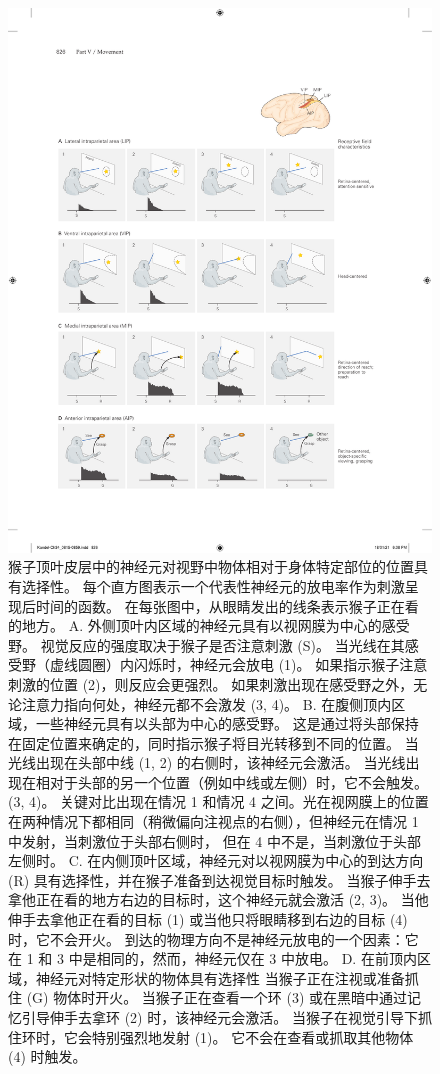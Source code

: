 \begin{figure}[htbp]
	\centering
	\includegraphics[width=0.9\linewidth]{chap34/fig_34_5}
	\caption{猴子顶叶皮层中的神经元对视野中物体相对于身体特定部位的位置具有选择性。 每个直方图表示一个代表性神经元的放电率作为刺激呈现后时间的函数。 在每张图中，从眼睛发出的线条表示猴子正在看的地方。 A. 外侧顶叶内区域的神经元具有以视网膜为中心的感受野。 视觉反应的强度取决于猴子是否注意刺激 (S)。 当光线在其感受野（虚线圆圈）内闪烁时，神经元会放电 (1)。 如果指示猴子注意刺激的位置 (2)，则反应会更强烈。 如果刺激出现在感受野之外，无论注意力指向何处，神经元都不会激发 (3, 4)。 B. 在腹侧顶内区域，一些神经元具有以头部为中心的感受野。 这是通过将头部保持在固定位置来确定的，同时指示猴子将目光转移到不同的位置。 当光线出现在头部中线 (1, 2) 的右侧时，该神经元会激活。 当光线出现在相对于头部的另一个位置（例如中线或左侧）时，它不会触发。 (3, 4)。 关键对比出现在情况 1 和情况 4 之间。光在视网膜上的位置在两种情况下都相同（稍微偏向注视点的右侧），但神经元在情况 1 中发射，当刺激位于头部右侧时， 但在 4 中不是，当刺激位于头部左侧时。 C. 在内侧顶叶区域，神经元对以视网膜为中心的到达方向 (R) 具有选择性，并在猴子准备到达视觉目标时触发。 当猴子伸手去拿他正在看的地方右边的目标时，这个神经元就会激活 (2, 3)。 当他伸手去拿他正在看的目标 (1) 或当他只将眼睛移到右边的目标 (4) 时，它不会开火。 到达的物理方向不是神经元放电的一个因素：它在 1 和 3 中是相同的，然而，神经元仅在 3 中放电。 D. 在前顶内区域，神经元对特定形状的物体具有选择性 当猴子正在注视或准备抓住 (G) 物体时开火。 当猴子正在查看一个环 (3) 或在黑暗中通过记忆引导伸手去拿环 (2) 时，该神经元会激活。 当猴子在视觉引导下抓住环时，它会特别强烈地发射 (1)。 它不会在查看或抓取其他物体 (4) 时触发。}
	\label{fig:34_5}
\end{figure}

